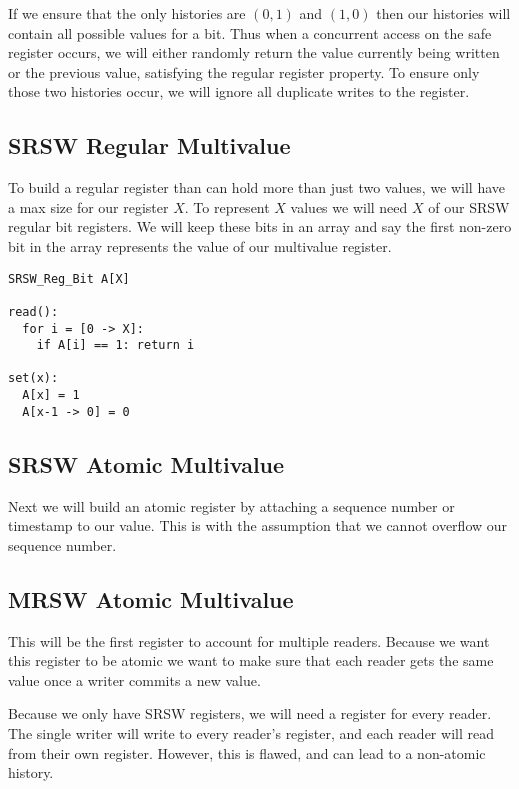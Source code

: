 \documentclass[twoside]{article}
\begin{document}
If we ensure that the only histories are $(0, 1)$ and $(1, 0)$ then our histories will contain all possible values for a bit. Thus when a concurrent access on the safe register occurs, we will either randomly return the value currently being written or the previous value, satisfying the regular register property. To ensure only those two histories occur, we will ignore all duplicate writes to the register.

\subsection{SRSW Regular Multivalue}

To build a regular register than can hold more than just two values, we will have a max size for our register $X$. To represent $X$ values we will need $X$ of our SRSW regular bit registers. We will keep these bits in an array and say the first non-zero bit in the array represents the value of our multivalue register.

\begin{verbatim}
SRSW_Reg_Bit A[X]

read():
  for i = [0 -> X]:
    if A[i] == 1: return i

set(x):
  A[x] = 1
  A[x-1 -> 0] = 0
\end{verbatim}

\subsection{SRSW Atomic Multivalue}

Next we will build an atomic register by attaching a sequence number or timestamp to our value. This is with the assumption that we cannot overflow our sequence number.

\newpage

\subsection{MRSW Atomic Multivalue}

This will be the first register to account for multiple readers. Because we want this register to be atomic we want to make sure that each reader gets the same value once a writer commits a new value.

Because we only have SRSW registers, we will need a register for every reader. The single writer will write to every reader's register, and each reader will read from their own register. However, this is flawed, and can lead to a non-atomic history.
\end{document}
